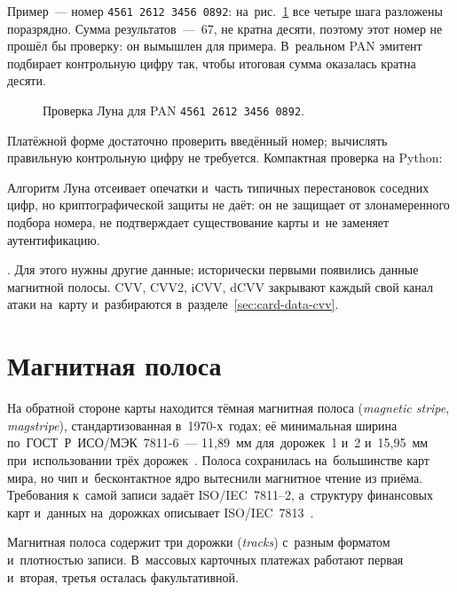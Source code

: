 Пример~--- номер \texttt{4561 2612 3456 0892}:
на~рис.~\ref{fig:luhn-check} все четыре шага разложены поразрядно. Сумма
результатов~---~67, не кратна десяти, поэтому этот номер не прошёл бы проверку:
он вымышлен для примера. В~реальном PAN эмитент подбирает контрольную цифру
так, чтобы итоговая сумма оказалась кратна десяти.

\begin{figure}[H]
  \centering
  \caption{Проверка Луна для PAN \texttt{4561 2612 3456 0892}.}\label{fig:luhn-check}
\end{figure}

Платёжной форме достаточно проверить введённый номер; вычислять правильную
контрольную цифру не требуется. Компактная проверка на Python:


Алгоритм Луна отсеивает опечатки и~часть типичных перестановок соседних цифр,
но криптографической защиты не даёт: он не защищает от злонамеренного подбора
номера, не подтверждает существование карты и~не заменяет аутентификацию.

.
Для этого нужны другие данные; исторически первыми появились данные магнитной
полосы. CVV, CVV2, iCVV, dCVV закрывают каждый свой канал атаки на~карту
и~разбираются в~разделе~\ref{sec:card-data-cvv}.

\section{Магнитная полоса}\label{sec:card-data-magstripe}

На обратной стороне карты находится тёмная магнитная полоса (\textit{magnetic
stripe}, \textit{magstripe}), стандартизованная в~1970-х~годах; её минимальная ширина
по~ГОСТ~Р~ИСО/МЭК~7811-6~--- 11,89~мм для~дорожек~1 и~2 и~15,95~мм при~использовании
трёх дорожек~\cite{gost-7811-6}. Полоса сохранилась на~большинстве карт мира,
но чип и~бесконтактное ядро вытеснили магнитное чтение из приёма. Требования к~самой записи задаёт ISO/IEC~7811--2, а~структуру
финансовых карт и~данных на~дорожках описывает
ISO/IEC~7813~\cite{iso-7811-2,iso-7813}.

Магнитная полоса содержит три дорожки (\textit{tracks}) с~разным форматом
и~плотностью записи. В~массовых карточных платежах работают первая и~вторая, третья осталась
факультативной.


